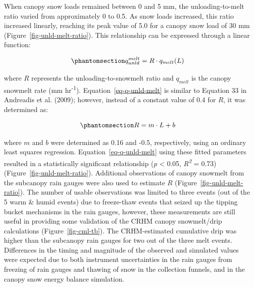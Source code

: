 \documentclass[
  letterpaper,
]{tex/uofsthesis-cs}
\begin{document}
When canopy snow loads remained between 0 and 5 mm, the
unloading-to-melt ratio varied from approximately 0 to 0.5. As snow
loads increased, this ratio increased linearly, reaching its peak value
of 5.0 for a canopy snow load of 30 mm
(Figure~\ref{fig-unld-melt-ratio}). This relationship can be expressed
through a linear function:

\begin{equation}\phantomsection\label{eq-q-unld-melt}{
q_{unld}^{melt} = R \cdot q_{melt}(L)
}\end{equation}

where \(R\) represents the unloading-to-snowmelt ratio and \(q_{melt}\)
is the canopy snowmelt rate (mm hr\textsuperscript{-1}).
Equation~\ref{eq-q-unld-melt} is similar to Equation 33 in Andreadis et
al. (2009); however, instead of a constant value of 0.4 for \(R\), it
was determined as:

\begin{equation}\phantomsection\label{eq-fm}{
R = m \cdot L + b
}\end{equation}

where \(m\) and \(b\) were determined as 0.16 and -0.5, respectively,
using an ordinary least squares regression.
Equation~\ref{eq-q-unld-melt} using these fitted parameters resulted in
a statistically significant relationship (\emph{p} \textless{} 0.05,
\emph{R\textsuperscript{2}} = 0.73) (Figure~\ref{fig-unld-melt-ratio}).
Additional observations of canopy snowmelt from the subcanopy rain
gauges were also used to estimate \(R\)
(Figure~\ref{fig-unld-melt-ratio}). The number of usable observations
was limited to three events (out of the 5 warm \& humid events) due to
freeze-thaw events that seized up the tipping bucket mechanisms in the
rain gauges, however, these measurements are still useful in providing
some validation of the CRHM canopy snowmelt/drip calculations
(Figure~\ref{fig-cml-tb}). The CRHM-estimated cumulative drip was higher
than the subcanopy rain gauges for two out of the three melt events.
Differences in the timing and magnitude of the observed and simulated
values were expected due to both instrument uncertainties in the rain
gauges from freezing of rain gauges and thawing of snow in the
collection funnels, and in the canopy snow energy balance simulation.
\end{document}
